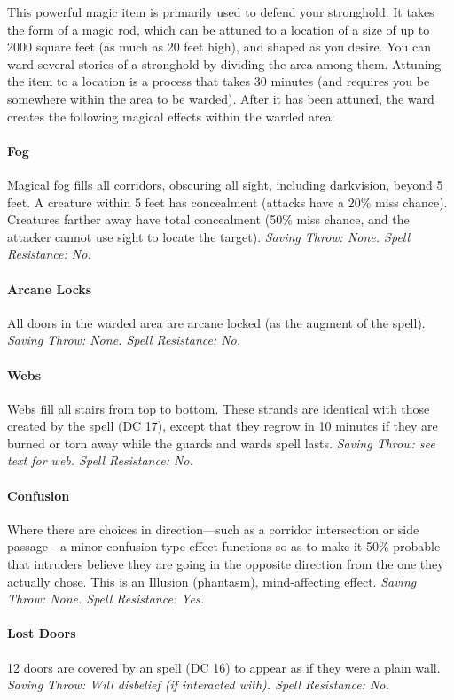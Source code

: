 This powerful magic item is primarily used to defend your stronghold.
It takes the form of a magic rod, which can be attuned to a location of a size of up to 2000 square feet (as much as 20 feet high), and shaped as you desire. 
You can ward several stories of a stronghold by dividing the area among them.  
Attuning the item to a location is a process that takes 30 minutes (and requires you be somewhere within the area to be warded).
After it has been attuned, the ward creates the following magical effects within the warded area:
\paragraph{Fog}
Magical fog fills all corridors, obscuring all sight, including darkvision, beyond 5 feet. 
A creature within 5 feet has concealment (attacks have a 20\% miss chance).
Creatures farther away have total concealment (50\% miss chance, and the attacker cannot use sight to locate the target). 
\emph{Saving Throw: None. Spell Resistance: No.}
\paragraph{Arcane Locks}
All doors in the warded area are arcane locked (as the augment of the  spell). \emph{Saving Throw: None. Spell Resistance: No.}
\paragraph{Webs}
Webs fill all stairs from top to bottom. These strands are identical with those created by the  spell (DC 17), 
except that they regrow in 10 minutes if they are burned or torn away while the guards and wards spell lasts. 
\emph{Saving Throw: see text for web. Spell Resistance: No.}
\paragraph{Confusion}
Where there are choices in direction—such as a corridor intersection or side passage - 
a minor confusion-type effect functions so as to make it 50\% probable that intruders believe they are going in the opposite direction from the one they actually chose. 
This is an Illusion (phantasm), mind-affecting effect. \emph{Saving Throw: None. Spell Resistance: Yes.}
\paragraph{Lost Doors}
12 doors are covered by an  spell (DC 16) to appear as if they were a plain wall. \emph{Saving Throw: Will disbelief (if interacted with). Spell Resistance: No.}

